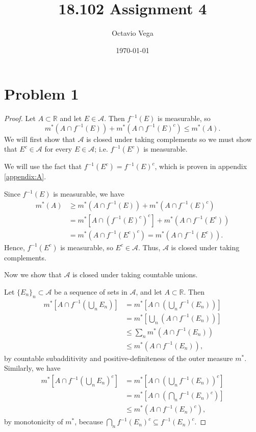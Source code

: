 \documentclass{article}
\title{18.102 Assignment 4}
\author{Octavio Vega}
\date\today
\begin{document}
\maketitle
	
\section*{Problem 1}
\begin{proof}
	Let $A \subset \mathbb{R}$ and let $E \in \mathcal{A}$. Then $f^{-1}(E)$ is measurable, so
	\begin{equation}
		m^*\left(A\cap f^{-1}(E)\right) + m^*\left(A\cap f^{-1}(E)^c\right) \leq m^*(A).
	\end{equation}
	We will first show that $\mathcal{A}$ is closed under taking complements so we must show that $E^c \in \mathcal{A}$ for every $E \in \mathcal{A}$; i.e. $f^{-1}(E^c)$ is measurable. 
	
	We will use the fact that $f^{-1}(E^c) = f^{-1}(E)^c$, which is proven in appendix \ref{appendix:A}.
	
	Since $f^{-1}(E)$ is measurable, we have
	\begin{align}
		m^*(A) &\geq m^*\left(A\cap f^{-1}(E)\right) + m^*\left(A\cap f^{-1}(E)^c\right) \\
		&= m^*\left[A\cap\left(f^{-1}(E)^c\right)^c\right] + m^*\left(A\cap f^{-1}(E^c)\right) \\
		&= m^*\left(A\cap f^{-1}(E^c)^c\right) = m^*\left(A\cap f^{-1}(E^c)\right).
	\end{align}
	Hence, $f^{-1}(E^c)$ is measurable, so $E^c \in \mathcal{A}$. Thus, $\mathcal{A}$ is closed under taking complements.
	
	Now we show that $\mathcal{A}$ is closed under taking countable unions. 
	
	Let $\{E_n\}_n \subset \mathcal{A}$ be a sequence of sets in $\mathcal{A}$, and let $A\subset \mathbb{R}$. Then 
	\begin{align}
		m^*\left[A\cap f^{-1}\left(\bigcup_n E_n\right)\right] &= m^*\left[A\cap\left(\bigcup_n f^{-1}(E_n)\right)\right] \\
		&= m^*\left[\bigcup_n\left(A\cap f^{-1}(E_n)\right)\right] \\
		& \leq \sum_n m^*\left(A\cap f^{-1}(E_n)\right) \\
		& \leq m^*\left(A\cap f^{-1}(E_n)\right),
	\end{align}
	by countable subadditivity and positive-definiteness of the outer measure $m^*$. Similarly, we have
	\begin{align}
		m^*\left[A\cap f^{-1}\left(\bigcup_n E_n\right)^c\right] &= m^*\left[A\cap \left(\bigcup_n f^{-1}(E_n)\right)^c\right] \\
		&= m^*\left[A\cap\left(\bigcap_n f^{-1}(E_n)^c\right)\right] \\
		&\leq m^*\left(A\cap f^{-1}(E_n)^c\right),
	\end{align}
	by monotonicity of $m^*$, because $\bigcap_n f^{-1}(E_n)^c \subseteq f^{-1}(E_n)^c$.
	

\end{proof}
\end{document}
